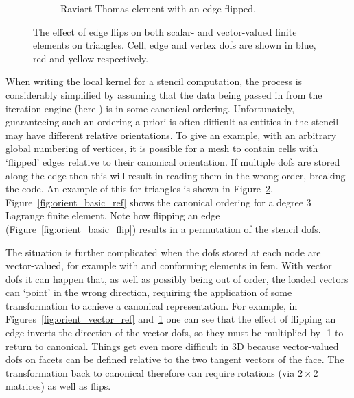 \begin{figure}
\begin{subfigure}{0.45\textwidth}
    \caption{Raviart-Thomas element with an edge flipped.}
    \label{fig:orient_vector_flip}
  \end{subfigure}

  \caption{
    The effect of edge flips on both scalar- and vector-valued finite elements on triangles.
    Cell, edge and vertex \glspl{dof} are shown in blue, red and yellow respectively.
  }
  \label{fig:orient}
\end{figure}

When writing the local kernel for a stencil computation, the process is considerably simplified by assuming that the data being passed in from the iteration engine (here ) is in some canonical ordering.
Unfortunately, guaranteeing such an ordering a priori is often difficult as entities in the stencil may have different relative orientations.
To give an example, with an arbitrary global numbering of vertices, it is possible for a mesh to contain cells with `flipped' edges relative to their canonical orientation.
If multiple \glspl{dof} are stored along the edge then this will result in reading them in the wrong order, breaking the code.
An example of this for triangles is shown in Figure~\ref{fig:orient}.
Figure~\ref{fig:orient_basic_ref} shows the canonical ordering for a degree 3 Lagrange finite element.
Note how flipping an edge (Figure~\ref{fig:orient_basic_flip}) results in a permutation of the stencil \glspl{dof}.

The situation is further complicated when the \glspl{dof} stored at each node are vector-valued, for example with \hdiv and \hcurl conforming elements in \gls{fem}.
With vector \glspl{dof} it can happen that, as well as possibly being out of order, the loaded vectors can `point' in the wrong direction, requiring the application of some transformation to achieve a canonical representation.
For example, in Figures~\ref{fig:orient_vector_ref} and~\ref{fig:orient_vector_flip} one can see that the effect of flipping an edge inverts the direction of the vector \glspl{dof}, so they must be multiplied by -1 to return to canonical.
Things get even more difficult in 3D because vector-valued \glspl{dof} on facets can be defined relative to the two tangent vectors of the face.
The transformation back to canonical therefore can require rotations (via $2\times2$ matrices) as well as flips.

